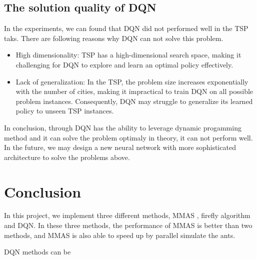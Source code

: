 \documentclass[twocolumn, a4paper]{extarticle}
\begin{document}
\subsection{The solution quality of DQN}

In the experiments, we can found that DQN did not performed well in the TSP taks. There are following reasons why DQN can not solve this problem.

\begin{itemize}
	\item High dimensionality: TSP has a high-dimensional search space, making it challenging for DQN to explore and learn an optimal policy effectively.
	\item Lack of generalization: In the TSP, the problem size increases exponentially with the number of cities, making it impractical to train DQN on all possible problem instances. Consequently, DQN may struggle to generalize its learned policy to unseen TSP instances.
\end{itemize}

In conclusion, through DQN has the ability to leverage dynamic progamming method and it can solve the problem optimaly in theory, it can not perform well. In the future, we may design a new neural network with more sophisticated architecture to solve the problems above. 



\section{Conclusion}

In this project, we implement three different methods, MMAS \cite{stutzle1999aco}, firefly algorithm\cite{jati2011evolutionary} and DQN\cite{mnih2013playing}. In these three methods, the performance of MMAS is better than two methods, and MMAS is also able to speed up by parallel simulate the ants. 

DQN methods can be 


\printbibliography
\end{document}

